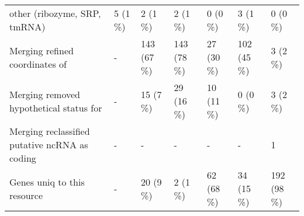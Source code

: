 {\begin{tabular}{lllllll}
\hspace{1em}other (ribozyme, SRP, tmRNA) & 5 (1 \%) & 2 (1 \%) & 2 (1 \%) & 0 (0 \%) & 3 (1 \%) & 0 (0 \%)\\
Merging refined coordinates of & - & 143 (67 \%) & 143 (78 \%) & 27 (30 \%) & 102 (45 \%) & 3 (2 \%)\\
Merging removed hypothetical status for & - & 15 (7 \%) & 29 (16 \%) & 10 (11 \%) & 0 (0 \%) & 3 (2 \%)\\
Merging reclassified putative ncRNA as coding & - & - & - & - & - & 1\\
Genes uniq to this resource & - & 20 (9 \%) & 2 (1 \%) & 62 (68 \%) & 34 (15 \%) & 192 (98 \%)\\
\bottomrule
\end{tabular}}
